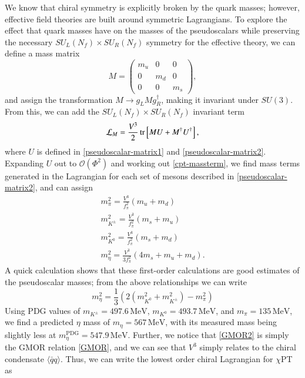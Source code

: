\documentclass[aps,prd,onecolumn,showpacs,amsmath,amssymb,nofootinbib]{revtex4} \pdfoutput=1
\newcommand{\cpt}{$\chi$PT}
\newcommand{\groupsu}[1]{S\!U(#1)}
\newcommand{\mev}{\mathrm{MeV}}
\begin{document}
We know that chiral symmetry is explicitly broken by the quark masses; however, effective field theories are built around symmetric Lagrangians. To explore the effect that quark masses have on the masses of the pseudoscalars while preserving the necessary ${S\!U}_L(N_f)\times {S\!U}_R(N_f)$ symmetry for the effective theory, we can define a mass matrix
\begin{equation}
    \label{mass-matrix}
    M = \begin{pmatrix}
            m_{u} & 0 &0 \\
            0 & m_{d} & 0 \\
            0 & 0     & m_{s} 
        \end{pmatrix},
\end{equation}
and assign the transformation $M \rightarrow g_L M g^{\dagger}_{R}$, making it invariant under $\groupsu{3}$. From this, we can add the ${S\!U}_L(N_f)\times {S\!U}_R(N_f)$ invariant term
\begin{equation}
    \label{cpt-massterm}
    \mathcal{L}_{M} = \frac{V^{3}}{2}\tr \left[MU + M^{\dagger}U^{\dagger} \right],
\end{equation}
where $U$ is defined in \eqref{pseudoscalar-matrix1} and \eqref{pseudoscalar-matrix2}. Expanding $U$ out to $\mathcal{O}\left(\Phi^2\right)$ and working out \eqref{cpt-massterm}, we find mass terms generated in the Lagrangian for each set of mesons described in \eqref{pseudoscalar-matrix2}, and can assign
\begin{gather}
    m_\pi^{2} = \frac{V^3}{f_\pi^{2}}(m_u + m_d) \label{GMOR2}\\
    m_{K^{\pm}}^{2} = \frac{V^3}{f_\pi^{2}}(m_s + m_u)  \\
    m_{K^{0}}^{2} = \frac{V^3}{f_\pi^{2}}(m_s + m_d)  \\
    m_{\eta}^{2} = \frac{V^3}{3f_\pi^{2}}(4m_s + m_u + m_d). 
\end{gather}
A quick calculation shows that these first-order calculations are good estimates of the pseudoscalar masses; from the above relationships we can write
\begin{equation}
    m_\eta^{2} = \frac{1}{3}\left( 2\left(m^2_{K^0}+m^2_{K^\pm}\right) - m_\pi^{2} \right)
\end{equation}
Using PDG values \cite{PDG2018} of $m_{K^\pm}=497.6\,\mev$, $m_{K^0}=493.7\,\mev$, and $m_{\pi}=135\,\mev$, we find a predicted $\eta$ mass of $m_\eta = 567\,\mev$, with its measured mass being slightly less at $m_\eta^{\mathrm{PDG}} = 547.9\,\mev$. Further, we notice that \eqref{GMOR2} is simply the GMOR relation \eqref{GMOR}, and we can see that $V^3$ simply relates to the chiral condensate $\langle \bar{q}q\rangle$. Thus, we can write the lowest order chiral Lagrangian for {\cpt} as
\end{document}
